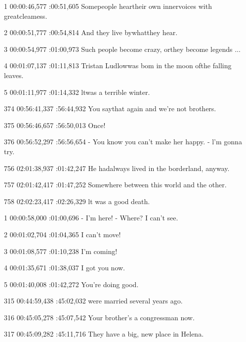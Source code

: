 \begin{subexam}

1
00:00:46,577 :00:51,605
Somepeople heartheir own
innervoices with greatcleamess.

2
00:00:51,777 :00:54,814
And they live bywhatthey hear.

3
00:00:54,977 :01:00,973
Such people become crazy,
orthey become legends ...

4
00:01:07,137 :01:11,813
Tristan Ludlowwas bom
in the moon ofthe falling leaves.

5
00:01:11,977 :01:14,332
ltwas a terrible winter.

374
00:56:41,337 :56:44,932
You saythat again
and we're not brothers.

375
00:56:46,657 :56:50,013
Once!

376
00:56:52,297 :56:56,654
- You know you can't make her happy.
- l'm gonna try.

756
02:01:38,937 :01:42,247
He hadalways lived
in the borderland, anyway.

757
02:01:42,417 :01:47,252
Somewhere between this world
and the other.

758
02:02:23,417 :02:26,329
lt was a good death.
\end{subexam}
\hspace{0.5cm}
\begin{subexam}
1
00:00:58,000 :01:00,696
- I'm here!
- Where? I can't see.

2
00:01:02,704 :01:04,365
I can't move!

3
00:01:08,577 :01:10,238
I'm coming!

4
00:01:35,671 :01:38,037
I got you now.

5
00:01:40,008 :01:42,272
You're doing good.

315
00:44:59,438 :45:02,032
were married several years ago.

316
00:45:05,278 :45:07,542
Your brother's a congressman now.

317
00:45:09,282 :45:11,716
They have a big, new place
in Helena.
\end{subexam}



